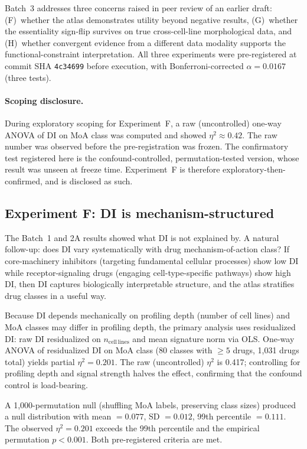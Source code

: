 \documentclass[11pt]{article}
\begin{document}
Batch~3 addresses three concerns raised in peer review of an earlier
draft: (F)~whether the atlas demonstrates utility beyond negative
results, (G)~whether the essentiality sign-flip survives on true
cross-cell-line morphological data, and (H)~whether convergent evidence
from a different data modality supports the functional-constraint
interpretation.  All three experiments were pre-registered at commit SHA
\texttt{4c34699} before execution, with Bonferroni-corrected
$\alpha = 0.0167$ (three tests).

\paragraph{Scoping disclosure.}
During exploratory scoping for Experiment~F, a raw (uncontrolled)
one-way ANOVA of DI on MoA class was computed and showed
$\eta^2 \approx 0.42$.  The raw number was observed before the
pre-registration was frozen.  The confirmatory test registered here is
the confound-controlled, permutation-tested version, whose result was
unseen at freeze time.  Experiment~F is therefore
exploratory-then-confirmed, and is disclosed as such.

\subsection{Experiment F: DI is mechanism-structured}

The Batch~1 and 2A results showed what DI is not explained by.  A
natural follow-up: does DI vary systematically with drug
mechanism-of-action class?  If core-machinery inhibitors (targeting
fundamental cellular processes) show low DI while receptor-signaling
drugs (engaging cell-type-specific pathways) show high DI, then DI
captures biologically interpretable structure, and the atlas stratifies
drug classes in a useful way.

Because DI depends mechanically on profiling depth (number of cell
lines) and MoA classes may differ in profiling depth, the primary
analysis uses residualized DI: raw DI residualized on
$n_{\mathrm{cell\,lines}}$ and mean signature norm via OLS.  One-way
ANOVA of residualized DI on MoA class (80 classes with $\geq 5$ drugs,
1{,}031 drugs total) yields partial $\eta^2 = 0.201$.  The raw
(uncontrolled) $\eta^2$ is 0.417; controlling for profiling depth and
signal strength halves the effect, confirming that the confound control
is load-bearing.

A 1{,}000-permutation null (shuffling MoA labels, preserving class
sizes) produced a null distribution with mean $= 0.077$,
SD $= 0.012$, 99th percentile $= 0.111$.  The observed
$\eta^2 = 0.201$ exceeds the 99th percentile and the empirical
permutation $p < 0.001$.  Both pre-registered criteria are met.
\end{document}

